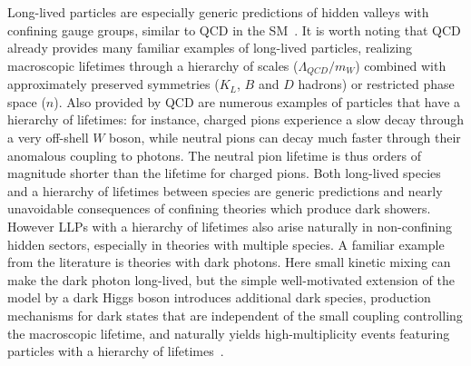 Long-lived particles are especially generic predictions of hidden valleys with confining gauge groups, similar to QCD in the SM~\cite{Strassler:2006im}. It is worth noting that QCD already provides many familiar examples of long-lived particles, realizing macroscopic lifetimes through a hierarchy of scales ($\Lambda_{QCD}/m_W$) combined with approximately preserved symmetries ($K_L$, $B$ and $D$ hadrons) or restricted phase space ($n$). Also provided by QCD are numerous examples of particles that have a hierarchy of lifetimes: for instance, charged pions experience a slow decay through a very off-shell $W$ boson, while neutral pions can decay much faster through their anomalous coupling to photons. The neutral pion lifetime is thus orders of magnitude shorter than the lifetime for charged pions. Both long-lived species and a hierarchy of lifetimes between species are generic predictions and nearly unavoidable consequences of confining theories which produce dark showers. However LLPs with a hierarchy of lifetimes also arise naturally in non-confining hidden sectors, especially in theories with multiple species. A familiar example from the literature is theories with dark photons. Here small kinetic mixing can make the dark photon long-lived, but the simple well-motivated extension of the model by a dark Higgs boson introduces additional dark species,  production mechanisms for dark states that are independent of the small coupling controlling the macroscopic lifetime, and naturally yields high-multiplicity events featuring particles with a hierarchy of lifetimes~\cite{Schabinger:2005ei,Chan:2011aa,Curtin:2014cca}.

